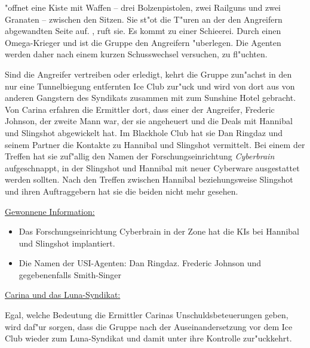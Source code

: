 \xl{} "offnet eine Kiste mit Waffen -- drei Bolzenpistolen, zwei Railguns und zwei Granaten -- zwischen den Sitzen. Sie st"o\3t die T"uren an der den Angreifern abgewandten Seite auf. , ruft sie. Es kommt zu einer Schie\3erei. Durch einen Omega-Krieger und \xl{} ist die Gruppe den Angreifern "uberlegen. Die Agenten werden daher nach einem kurzen Schusswechsel versuchen, zu fl"uchten.

Sind die Angreifer vertreiben oder erledigt, kehrt die Gruppe zun"achst in den nur eine Tunnelbiegung entfernten Ice Club zur"uck und wird von dort aus von anderen Gangstern des Syndikats zusammen mit \xl{} zum Sunshine Hotel gebracht. Von Carina erfahren die Ermittler dort, dass einer der Angreifer, Frederic Johnson, der zweite Mann war, der sie angeheuert und die Deals mit Hannibal und Slingshot abgewickelt hat. Im Blackhole Club hat sie Dan Ringdaz und seinem Partner die Kontakte zu Hannibal und Slingshot vermittelt. Bei einem der Treffen hat sie zuf"allig den Namen der Forschungseinrichtung \emph{Cyberbrain} aufgeschnappt, in der Slingshot und Hannibal mit neuer Cyberware ausgestattet werden sollten. Nach den Treffen zwischen Hannibal beziehungsweise Slingshot und ihren Auftraggebern hat sie die beiden nicht mehr gesehen.

\begin{remarks}
	\underline{Gewonnene Information:}
	
	\begin{itemize}
		\item Das Forschungseinrichtung Cyberbrain in der Zone hat die KIs bei Hannibal und Slingshot implantiert.
		\item Die Namen der USI-Agenten: Dan Ringdaz. Frederic Johnson und gegebenenfalls Smith-Singer
	\end{itemize}

	\underline{Carina und das Luna-Syndikat:}

	Egal, welche Bedeutung die Ermittler Carinas Unschuldsbeteuerungen geben, wird \xl{} daf"ur sorgen, dass die Gruppe nach der Auseinandersetzung vor dem Ice Club wieder zum Luna-Syndikat und damit unter ihre Kontrolle zur"uckkehrt.
\end{remarks}

